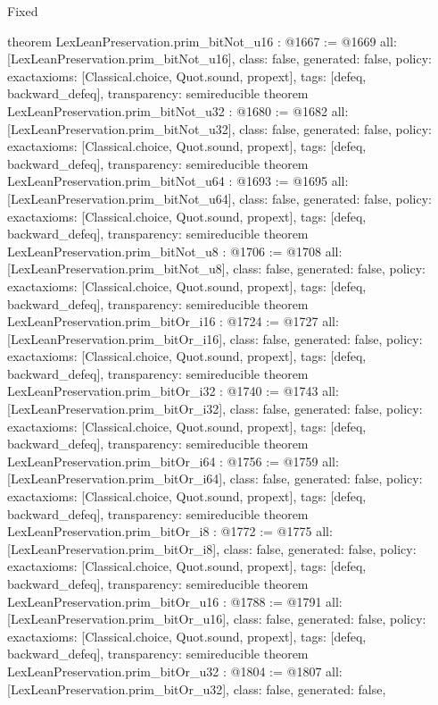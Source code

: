 \begin{lexlean}{Fixed}
\begin{coremodule}
{}
theorem LexLeanPreservation.prim_bitNot_u16 : @1667 := @1669 {
  all: [LexLeanPreservation.prim_bitNot_u16],
  class: false,
  generated: false,
  policy: exact{axioms: [Classical.choice, Quot.sound, propext]},
  tags: [defeq, backward_defeq],
  transparency: semireducible
}
theorem LexLeanPreservation.prim_bitNot_u32 : @1680 := @1682 {
  all: [LexLeanPreservation.prim_bitNot_u32],
  class: false,
  generated: false,
  policy: exact{axioms: [Classical.choice, Quot.sound, propext]},
  tags: [defeq, backward_defeq],
  transparency: semireducible
}
theorem LexLeanPreservation.prim_bitNot_u64 : @1693 := @1695 {
  all: [LexLeanPreservation.prim_bitNot_u64],
  class: false,
  generated: false,
  policy: exact{axioms: [Classical.choice, Quot.sound, propext]},
  tags: [defeq, backward_defeq],
  transparency: semireducible
}
theorem LexLeanPreservation.prim_bitNot_u8 : @1706 := @1708 {
  all: [LexLeanPreservation.prim_bitNot_u8],
  class: false,
  generated: false,
  policy: exact{axioms: [Classical.choice, Quot.sound, propext]},
  tags: [defeq, backward_defeq],
  transparency: semireducible
}
theorem LexLeanPreservation.prim_bitOr_i16 : @1724 := @1727 {
  all: [LexLeanPreservation.prim_bitOr_i16],
  class: false,
  generated: false,
  policy: exact{axioms: [Classical.choice, Quot.sound, propext]},
  tags: [defeq, backward_defeq],
  transparency: semireducible
}
theorem LexLeanPreservation.prim_bitOr_i32 : @1740 := @1743 {
  all: [LexLeanPreservation.prim_bitOr_i32],
  class: false,
  generated: false,
  policy: exact{axioms: [Classical.choice, Quot.sound, propext]},
  tags: [defeq, backward_defeq],
  transparency: semireducible
}
theorem LexLeanPreservation.prim_bitOr_i64 : @1756 := @1759 {
  all: [LexLeanPreservation.prim_bitOr_i64],
  class: false,
  generated: false,
  policy: exact{axioms: [Classical.choice, Quot.sound, propext]},
  tags: [defeq, backward_defeq],
  transparency: semireducible
}
theorem LexLeanPreservation.prim_bitOr_i8 : @1772 := @1775 {
  all: [LexLeanPreservation.prim_bitOr_i8],
  class: false,
  generated: false,
  policy: exact{axioms: [Classical.choice, Quot.sound, propext]},
  tags: [defeq, backward_defeq],
  transparency: semireducible
}
theorem LexLeanPreservation.prim_bitOr_u16 : @1788 := @1791 {
  all: [LexLeanPreservation.prim_bitOr_u16],
  class: false,
  generated: false,
  policy: exact{axioms: [Classical.choice, Quot.sound, propext]},
  tags: [defeq, backward_defeq],
  transparency: semireducible
}
theorem LexLeanPreservation.prim_bitOr_u32 : @1804 := @1807 {
  all: [LexLeanPreservation.prim_bitOr_u32],
  class: false,
  generated: false,
}
\end{coremodule}
\end{lexlean}
